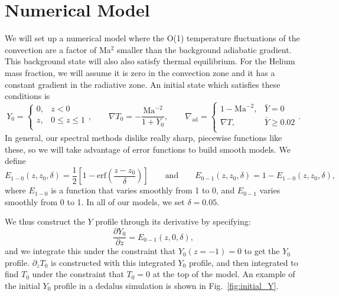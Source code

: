 \documentclass[onecolumn, amsmath, amsfonts, amssymb]{aastex62}
\newcommand{\grad}{\ensuremath{\nabla}}
\begin{document}
\section{Numerical Model}
We will set up a numerical model where the O(1) temperature fluctuations of the convection are a factor of Ma$^2$ smaller than the background adiabatic gradient.
This background state will also also satisfy thermal equilibrium.
For the Helium mass fraction, we will assume it is zero in the convection zone and it has a constant gradient in the radiative zone.
An initial state which satisfies these conditions is
\begin{equation}
Y_0 = 
\begin{cases}
0,	 	&	z < 0 \\
z, 		& 	0 \leq z \leq 1 \\
\end{cases},\qquad
\grad T_0 = -\frac{\mathrm{Ma}^{-2}}{1 + Y_0}, \qquad
\grad_{\text{ad}} = 
\begin{cases}
1 - \mathrm{Ma}^{-2},				& 	\bar{Y} = 0 \\
\grad T,		&	\bar{Y} \geq 0.02 \\
\end{cases}.
\label{eqn:model}
\end{equation}
In general, our spectral methods dislike really sharp, piecewise functions like these, so we will take advantage of error functions to build smooth models.
We define
\begin{equation}
E_{1-0}(z, z_0, \delta) = \frac{1}{2}\left[1 - \text{erf}\left(\frac{z - z_0}{\delta}  \right)    \right]
\qquad\text{and}\qquad
E_{0-1}(z, z_0, \delta) = 1 - E_{1-0}(z, z_0, \delta),
\end{equation}
where $E_{1-0}$ is a function that varies smoothly from 1 to 0, and $E_{0-1}$ varies smoothly from 0 to 1.
In all of our models, we set $\delta = 0.05$.

We thus construct the $Y$ profile through its derivative by specifying:
\begin{equation}
\frac{ \partial Y_0}{\partial z} = E_{0-1}(z, 0, \delta),
\end{equation}
and we integrate this under the constraint that $Y_0(z = -1) = 0$ to get the $Y_0$ profile.
$\partial_z T_0$ is constructed with this integrated $Y_0$ profile, and then integrated to find $T_0$ under the constraint that $T_0 = 0$ at the top of the model.
An example of the initial $Y_0$ profile in a dedalus simulation is shown in Fig.~\ref{fig:initial_Y}.
\end{document}
